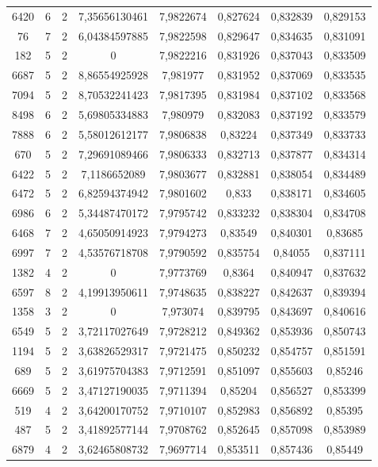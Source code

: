 \begin{longtable}{|c|c|c|c|c|c|c|c|}
6420 & 6 & 2 & 7,35656130461 & 7,9822674 & 0,827624 & 0,832839 & 0,829153 \\
76 & 7 & 2 & 6,04384597885 & 7,9822598 & 0,829647 & 0,834635 & 0,831091 \\
182 & 5 & 2 & 0 & 7,9822216 & 0,831926 & 0,837043 & 0,833509 \\
6687 & 5 & 2 & 8,86554925928 & 7,981977 & 0,831952 & 0,837069 & 0,833535 \\
7094 & 5 & 2 & 8,70532241423 & 7,9817395 & 0,831984 & 0,837102 & 0,833568 \\
8498 & 6 & 2 & 5,69805334883 & 7,980979 & 0,832083 & 0,837192 & 0,833579 \\
7888 & 6 & 2 & 5,58012612177 & 7,9806838 & 0,83224 & 0,837349 & 0,833733 \\
670 & 5 & 2 & 7,29691089466 & 7,9806333 & 0,832713 & 0,837877 & 0,834314 \\
6422 & 5 & 2 & 7,1186652089 & 7,9803677 & 0,832881 & 0,838054 & 0,834489 \\
6472 & 5 & 2 & 6,82594374942 & 7,9801602 & 0,833 & 0,838171 & 0,834605 \\
6986 & 6 & 2 & 5,34487470172 & 7,9795742 & 0,833232 & 0,838304 & 0,834708 \\
6468 & 7 & 2 & 4,65050914923 & 7,9794273 & 0,83549 & 0,840301 & 0,83685 \\
6997 & 7 & 2 & 4,53576718708 & 7,9790592 & 0,835754 & 0,84055 & 0,837111 \\
1382 & 4 & 2 & 0 & 7,9773769 & 0,8364 & 0,840947 & 0,837632 \\
6597 & 8 & 2 & 4,19913950611 & 7,9748635 & 0,838227 & 0,842637 & 0,839394 \\
1358 & 3 & 2 & 0 & 7,973074 & 0,839795 & 0,843697 & 0,840616 \\
6549 & 5 & 2 & 3,72117027649 & 7,9728212 & 0,849362 & 0,853936 & 0,850743 \\
1194 & 5 & 2 & 3,63826529317 & 7,9721475 & 0,850232 & 0,854757 & 0,851591 \\
689 & 5 & 2 & 3,61975704383 & 7,9712591 & 0,851097 & 0,855603 & 0,85246 \\
6669 & 5 & 2 & 3,47127190035 & 7,9711394 & 0,85204 & 0,856527 & 0,853399 \\
519 & 4 & 2 & 3,64200170752 & 7,9710107 & 0,852983 & 0,856892 & 0,85395 \\
487 & 5 & 2 & 3,41892577144 & 7,9708762 & 0,852645 & 0,857098 & 0,853989 \\
6879 & 4 & 2 & 3,62465808732 & 7,9697714 & 0,853511 & 0,857436 & 0,85449 \\

\end{longtable}
